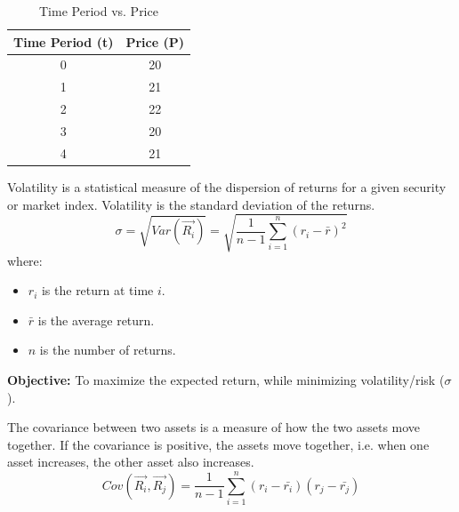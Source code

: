 \begin{table}[h!]
    \centering
    \begin{tabular}{|c|c|}
        \hline
        \textbf{Time Period (t)} & \textbf{Price (P)} \\ \hline
        0                        & 20                 \\ \hline
        1                        & 21                 \\ \hline
        2                        & 22                 \\ \hline
        3                        & 20                 \\ \hline
        4                        & 21                 \\ \hline
    \end{tabular}
    \caption{Time Period vs. Price}
    \label{tab:time_period_price}
\end{table}

\begin{definition}
    [Volatility]
    Volatility is a statistical measure of the dispersion of returns for a given security or market index.
    Volatility is the standard deviation of the returns.
    \begin{equation}
        \sigma = \sqrt{Var(\overrightarrow{R_i})} = \sqrt{\frac{1}{n-1} \sum_{i=1}^{n} (r_i - \bar{r})^2}
    \end{equation}
    where:
    \begin{itemize}
        \item $r_i$ is the return at time $i$.
        \item $\bar{r}$ is the average return.
        \item $n$ is the number of returns.
    \end{itemize}
\end{definition}

\begin{proposition}
    \textbf{Objective:} To maximize the expected return, while minimizing volatility/risk ($\sigma$).\\
\end{proposition}
\begin{definition}
    [Covariance]
    The covariance between two assets is a measure of how the two assets move together. If the covariance is positive, the assets move together, i.e. when one asset increases, the other asset also increases.
    \begin{equation}
        Cov(\overrightarrow{R_i},\overrightarrow{R_j}) = \frac{1}{n-1} \sum_{i=1}^{n} (r_{i} - \bar{r_i})(r_{j} - \bar{r_j})
    \end{equation}
\end{definition}

